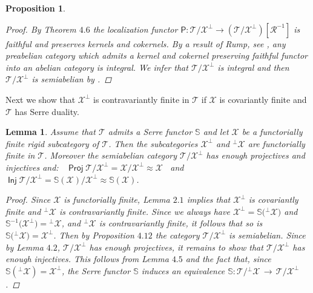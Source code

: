 \documentclass[oneside, a4paper,reqno]{amsart}
\numberwithin{equation}{section}
\newtheorem{lem}[thm]{Lemma}
\newtheorem{prop}[thm]{Proposition}
\theoremstyle{definition}
\begin{document}
\begin{prop}
\begin{proof}
By Theorem $4.6$ the localization functor $\mathsf{P} \colon  {\mathcal T}/{\mathcal X}^{\bot} {\longrightarrow} ({\mathcal T}/{\mathcal X}^{\bot})[\mathcal R^{-1}]$ is faithful and preserves  kernels and cokernels. By a result of Rump, see \cite[Proposition 7]{Rump}, any preabelian category which admits a kernel and cokernel preserving faithful functor into an abelian category is integral.  We infer that ${\mathcal T}/{\mathcal X}^{\bot}$ is integral and then ${\mathcal T}/{\mathcal X}^{\bot}$ is semiabelian by \cite[Corollary 1]{Rump}.   
\end{proof}
\end{prop}

Next we show that ${\mathcal X}^{\bot}$ is contravariantly finite in ${\mathcal T}$ if ${\mathcal X}$ is covariantly finite and ${\mathcal T}$ has Serre duality. 

\begin{lem} Assume that ${\mathcal T}$ admits a Serre functor $\mathbb S$ and  let ${\mathcal X}$ be a functorially finite rigid subcategory of ${\mathcal T}$. Then the subcategories ${\mathcal X}^{\bot}$ and ${^{\bot}}{\mathcal X}$ are functorially finite in ${\mathcal T}$. Moreover the semiabelian category ${\mathcal T}/{\mathcal X}^{\bot}$ has enough projectives and injectives and: \, $\operatorname*{\mathsf{Proj}}{\mathcal T}/{\mathcal X}^{\bot} = {\mathcal X}/{\mathcal X}^{\bot} \approx {\mathcal X}$ \, and \,   $\operatorname*{\mathsf{Inj}}{\mathcal T}/{\mathcal X}^{\bot} = \mathbb S({\mathcal X})/{\mathcal X}^{\bot} \approx \mathbb S({\mathcal X})$.   
\begin{proof} Since ${\mathcal X}$ is functorially finite, Lemma $2.1$ implies that ${\mathcal X}^{\bot}$ is covariantly finite and ${^{\bot}}{\mathcal X}$ is contravariantly finite. Since we always have ${\mathcal X}^{\bot} = \mathbb{S}\big({^{\bot}}{\mathcal X}\big)$ and $\mathbb{S}^{-1}\big({\mathcal X}^{\bot}\big) = {^{\bot}}{\mathcal X}$, 
and ${^{\bot}}{\mathcal X}$ is contravariantly finite, it follows that so is $\mathbb{S}\big({^{\bot}}{\mathcal X}\big) = {\mathcal X}^{\bot}$. Then by Proposition $4.12$ the category ${\mathcal T}/{\mathcal X}^{\bot}$ is semiabelian.  Since by Lemma $4.2$, ${\mathcal T}/{\mathcal X}^{\bot}$ has enough projectives, it remains to show that  ${\mathcal T}/{\mathcal X}^{\bot}$ has enough injectives. This follows from Lemma $4.5$  and the fact that, since $\mathbb S({^{\bot}}{\mathcal X}) = {\mathcal X}^{\bot}$, the Serre functor $\mathbb S$ induces an equivalence $\mathbb S \colon {\mathcal T}/{^{\bot}}{\mathcal X} \, {\longrightarrow} \, {\mathcal T}/{\mathcal X}^{\bot}$. 
\end{proof}
\end{lem}
\end{document}
